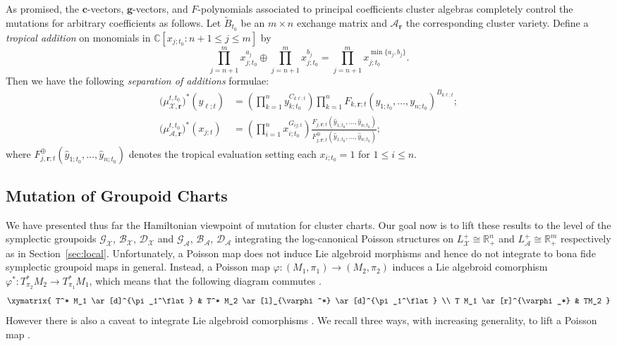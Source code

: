 \documentclass{amsart}
\numberwithin{equation}{section}
\newcommand{\bfc}{\mathbf{c}}
\newcommand{\bfg}{\mathbf{g}}
\newcommand{\bfr}{{\boldsymbol{r}}}
\newcommand{\cA}{\mathcal{A}}
\newcommand{\cB}{\mathcal{B}}
\newcommand{\cD}{\mathcal{D}}
\newcommand{\cG}{\mathcal{G}}
\newcommand{\cX}{\mathcal{X}}
\newcommand{\CC}{\mathbb{C}}
\newcommand{\RR}{\mathbb{R}}
\begin{document}
As promised, the $\bfc$-vectors, $\bfg$-vectors, and $F$-polynomials associated to principal coefficients cluster algebras completely control the mutations for arbitrary coefficients as follows.
Let $\tilde B_{t_0}$ be an $m\times n$ exchange matrix and $\cA_\bfr$ the corresponding cluster variety.
Define a \emph{tropical addition} on monomials in $\CC[x_{j;t_0}:n+1\le j\le m]$ by
\[\prod_{j=n+1}^m x_{j;t_0}^{a_j}\oplus \prod_{j=n+1}^m x_{j;t_0}^{b_j}=\prod_{j=n+1}^m x_{j;t_0}^{\min\{a_j,b_j\}}.\]
Then we have the following \emph{separation of additions} formulae:
\begin{align}
  \label{eq:separation of additions 1}
  \big(\mu_{\cX,\bfr}^{t,t_0}\big)^*(y_{\ell;t})&=\left(\prod_{k=1}^n y_{k;t_0}^{C_{k \ell;t}}\right) \prod_{k=1}^n F_{k,\bfr;t}(y_{1;t_0},\ldots,y_{n;t_0})^{B_{k \ell;t}};\\
  \label{eq:separation of additions 2}
  \big(\mu_{\cA,\bfr}^{t,t_0}\big)^*(x_{j;t})&=\left(\prod_{i=1}^n x_{i;t_0}^{G_{ij;t}}\right) \frac{F_{j,\bfr;t}(\hat y_{1;t_0},\ldots,\hat y_{n;t_0})}{F_{j,\bfr;t}^{\oplus}(\hat y_{1;t_0},\ldots,\hat y_{n;t_0})};
\end{align}
where $F_{j,\bfr;t}^{\oplus}(\hat y_{1;t_0},\ldots,\hat y_{n;t_0})$ denotes the tropical evaluation setting each $x_{i;t_0}=1$ for $1\le i \le n$.


\subsection{Mutation of Groupoid Charts}
\label{sec:groupoid mutations}

We have presented thus far the Hamiltonian viewpoint of mutation for cluster charts. Our goal now is to lift these results to the level of the symplectic groupoids $\cG_\cX$, $\cB_\cX$, $\cD_\cX$ and $\cG_\cA$, $\cB_\cA$, $\cD_\cA$ integrating the log-canonical Poisson structures on $L^+_\cX\cong\RR_+^n$ and $L^+_\cA\cong\RR_+^m$ respectively as in Section~\ref{sec:local}. Unfortunately,
 a Poisson map does not induce Lie algebroid morphisms and hence do not integrate to bona fide symplectic groupoid maps in general. Instead, a Poisson map $\varphi: (M_1, \pi_1) \to (M_2, \pi_2)$ induces a Lie algebroid comorphism $\varphi^*: T^*_{\pi_2} M_2 \to T^*_{\pi_1} M_1$, which means that the following diagram commutes \cite{Higgins1990}.
\begin{equation} 
	\xymatrix{
		T^* M_1 \ar[d]^{\pi_1^\flat} & T^* M_2 \ar[l]_{\varphi^*} \ar[d]^{\pi_1^\flat} \\
		T M_1 \ar[r]^{\varphi_*} & TM_2
	}
\end{equation}
However there is also a caveat to integrate Lie algebroid comorphisms \cite{MR3089758}. We recall three ways, with increasing generality, to lift a Poisson map .
\end{document}
